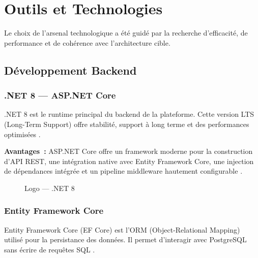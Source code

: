 \section{Outils et Technologies}
\label{sec:chap3_outils_technologies}

\noindent Le choix de l'arsenal technologique a été guidé par la recherche d'efficacité,
de performance et de cohérence avec l'architecture cible.

\subsection{Développement Backend}

\subsubsection{.NET 8 — ASP.NET Core}

\noindent .NET 8 est le runtime principal du backend de la plateforme. Cette version LTS
(Long-Term Support) offre stabilité, support à long terme et des performances optimisées
\cite{DotNet8}.

\textbf{Avantages~:} ASP.NET Core offre un framework moderne pour la construction d'API
REST, une intégration native avec Entity Framework Core, une injection de dépendances
intégrée et un pipeline middleware hautement configurable \cite{AspNetCore}.

\begin{figure}[H]
    \centering
    \caption{Logo --- .NET 8}
    \label{fig:logo_dotnet}
\end{figure}

\subsubsection{Entity Framework Core}

\noindent Entity Framework Core (EF Core) est l'ORM (Object-Relational Mapping) utilisé
pour la persistance des données. Il permet d'interagir avec PostgreSQL sans écrire de
requêtes SQL \cite{EFCore}.

